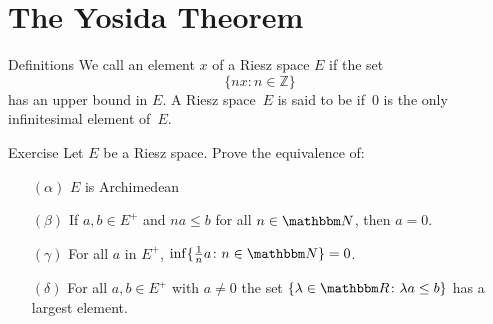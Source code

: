 \documentclass[main.tex]{subfiles}
\begin{document}
\section{The Yosida Theorem}
%
%
\begin{psec}{3.1}{Definitions}
We call an element $x$ 
of a Riesz space $E$
if the set
\begin{equation*}
\{ n x\colon n\in \mathbb Z \}
\end{equation*}
has an upper bound in $E$.
A Riesz space~$E$ is said to be
if~$0$ is the only infinitesimal element of~$E$.
\end{psec}
%
%
\begin{psec}{3.2}{Exercise}
Let $E$ be a Riesz space.
Prove the equivalence of:
\begin{enumerate}
\item[$(\alpha)$] \label{3.2-alpha}
$E$ is Archimedean
%
\item[$(\beta)$] \label{3.2-beta}
If $a,b\in E^+$ and $na\leq b$ for all $n\in \N$, then $a=0$.
%
\item[$(\gamma)$] \label{3.2-gamma}
For all $a$ in $E^+$, 
$\inf \{ \frac{1}{n} a\colon n\in\N \} = 0$.
%
\item[$(\delta)$] \label{3.2-delta}
For all $a,b\in E^+$ with $a\neq 0$ 
the set $\{ \lambda\in \R\colon \lambda a \leq b \}$
has a largest element.
\end{enumerate}
\end{psec}
\clearpage
\end{document}
